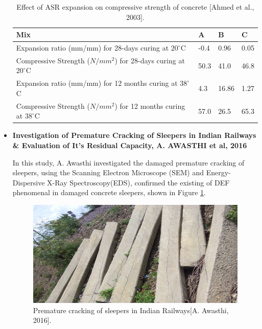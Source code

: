 \begin{itemize}
    \begin{table}[ht!]
      \caption{Effect of ASR expansion on compressive strength of concrete [Ahmed et al., 2003].}
        \centering

            \begin{tabular}{ |p{6cm}|p{1.5cm}|p{1.5cm}|p{1.5cm}| }
             \hline
             Mix &  A & B & C  \\ [0.5ex]
             \hline
             Expansion ratio (mm/mm) for 28-days curing at $20^\circ$C & -0.4 & 0.96 & 0.05 \\
             \hline
             Compressive Strength ($N/mm^2$) for 28-days curing at $20^\circ$C & 50.3 & 41.0 & 46.8 \\
             \hline
             Expansion ratio (mm/mm) for 12 months curing at $38^\circ$C & 4.3 & 16.86 & 1.27 \\
             \hline
             Compressive Strength ($N/mm^2$) for 12 months curing at $38^\circ$C & 57.0 & 26.5 & 65.3 \\ [0.5ex]
             \hline
            \end{tabular}

        \label{table:Ahmed et al.}
    \end{table}


    \item
    \textbf{Investigation of Premature Cracking of Sleepers in Indian Railways \& Evaluation of It's Residual Capacity, A. AWASTHI et al, 2016}

      In this study, A. Awasthi\cite{Awasthi} investigated the damaged premature cracking of sleepers, using the Scanning Electron Microscope (SEM) and Energy-Dispersive X-Ray Spectroscopy(EDS), confirmed the existing of DEF phenomenal in damaged concrete sleepers, shown in Figure \ref{fig:Awasthi_3}.

      \begin{figure}[ht!]
          \centering
          \includegraphics[width=.8\linewidth]{Files/Background/Anupam_3.png}
          \caption{Premature cracking of sleepers in Indian Railways[A. Awasthi, 2016\cite{Awasthi}].}
          \label{fig:Awasthi_3}
      \end{figure}


\end{itemize}
